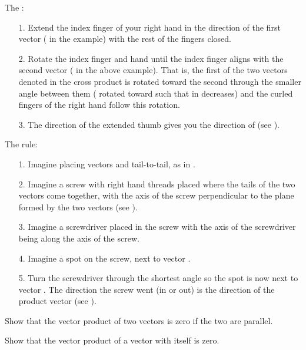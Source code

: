 {\noindent The :
\begin{itemize}
\item [1.] Extend the index finger of your right hand in the direction of
the first vector ( in the example) with the rest of the fingers closed.
\item [2.] Rotate the index finger and hand until the index finger aligns with
the second vector ( in the above example).
That is, the first of the two vectors denoted in the cross product is rotated
toward the second through the smaller angle between them ( rotated
toward  such that \m{\theta} in  decreases) and the curled
fingers of the right hand follow this rotation.
\item [3.] The direction of the extended thumb gives you the direction of
 (see ).
\end{itemize}

\noindent The  rule:
\begin{itemize}
\item [1.] Imagine placing vectors  and  tail-to-tail,
as in .
\item [2.] Imagine a screw with right hand threads placed where the tails of
the two vectors come together, with the axis of the screw perpendicular to the
plane formed by the two vectors (see ).
\item [3.] Imagine a screwdriver placed in the screw with the axis of the
screwdriver being along the axis of the screw.
\item [4.] Imagine a spot on the screw, next to vector .
\item [5.] Turn the screwdriver through the shortest angle so the spot is
now next to vector .
The direction the screw went (in or out) is the direction of the product vector
 (see ).
\end{itemize}

\tryit Show that the vector product of two vectors is zero if the two are
parallel.

\tryit Show that the vector product of a vector with itself is zero.

}%
%
